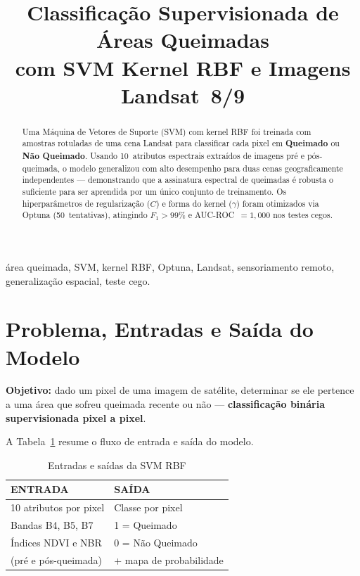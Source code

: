 \documentclass[conference]{IEEEtran}
\begin{document}
\title{Classificação Supervisionada de Áreas Queimadas\\
com SVM Kernel RBF e Imagens Landsat~8/9}

\author{
}

\maketitle

\begin{abstract}
Uma Máquina de Vetores de Suporte (SVM) com kernel RBF foi treinada com
amostras rotuladas de uma cena Landsat para classificar cada pixel em
\textbf{Queimado} ou \textbf{Não Queimado}. Usando 10~atributos espectrais
extraídos de imagens pré e pós-queimada, o modelo generalizou com alto
desempenho para duas cenas geograficamente independentes — demonstrando que
a assinatura espectral de queimadas é robusta o suficiente para ser aprendida
por um único conjunto de treinamento. Os hiperparâmetros de regularização
($C$) e forma do kernel ($\gamma$) foram otimizados via Optuna (50~tentativas),
atingindo $F_1 > 99\%$ e AUC-ROC~$= 1{,}000$ nos testes cegos.
\end{abstract}

\begin{IEEEkeywords}
área queimada, SVM, kernel RBF, Optuna, Landsat, sensoriamento remoto,
generalização espacial, teste cego.
\end{IEEEkeywords}

\section{Problema, Entradas e Saída do Modelo}

\textbf{Objetivo:} dado um pixel de uma imagem de satélite, determinar se
ele pertence a uma área que sofreu queimada recente ou não —
\textbf{classificação binária supervisionada pixel a pixel}.

A Tabela~\ref{tab:io} resume o fluxo de entrada e saída do modelo.

\begin{table}[!t]
  \caption{Entradas e saídas da SVM RBF}
  \label{tab:io}
  \centering
  \begin{tabular}{ll}
    \toprule
    \textbf{ENTRADA} & \textbf{SAÍDA} \\
    \midrule
    10 atributos por pixel & Classe por pixel \\
    Bandas B4, B5, B7 & 1 = Queimado \\
    Índices NDVI e NBR & 0 = Não Queimado \\
    (pré e pós-queimada) & + mapa de probabilidade \\
    \bottomrule
  \end{tabular}
\end{table}
\end{document}
